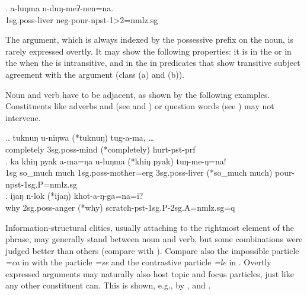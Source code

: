 \exg. a-luŋma n-duŋ-meʔ-nen=na.\\
		{\sc 1sg.poss}-liver {\sc neg-}pour{\sc -npst-1>2=nmlz.sg}\\


The  argument, which is always indexed by the possessive prefix on the noun, is rarely expressed overtly. It may show the following properties: it is in the  or in the  when the  is intransitive, and in the  in predicates that show transitive subject agreement with the  argument (class (a) and (b)). 

Noun and verb have to be adjacent, as shown by the following examples. Constituents like  adverbs and   (see \Next[a] and \Next[b]) or question words (see \Next[c]) may not intervene. 

\ex.\ag. tuknuŋ u-niŋwa (*tuknuŋ) tug-a-ma, {\hspace{-.4cm}\ob\dots\cb}\\
 completely {\sc 3sg.poss}-mind  (*completely) hurt{\sc [3sg]-pst-prf}\\
  
 \bg. ka khiŋ pyak a-ma=ŋa u-luŋma  (*khiŋ pyak) tuŋ-me-ŋ=na!\\
 {\sc 1sg} so\_much much {\sc 1sg.poss-}mother{\sc =erg} {\sc 3sg.poss-}liver (*so\_much much) pour{\sc [ 3sg.A]-npst-1sg.P=nmlz.sg}\\
 \bg. ijaŋ n-lok (*ijaŋ) khot-a-ŋ-ga=na=i?\\
 why	{\sc 2sg.poss}-anger (*why) scratch{\sc -pst-1sg.P-2sg.A=nmlz.sg=q}\\


Information-structural clitics, usually attaching to the rightmost element of the phrase, may generally stand between noun and verb, 
but some combinations were judged better than others (compare \Next[a] with \Next[b]). Compare also the impossible  particle \emph{=ca} in \Next[a] with the  particle \emph{=se} and the contrastive particle \emph{=le} in \NNext. Overtly expressed  arguments  may naturally also host topic and focus particles, just like any other constituent can. This is shown, e.g., by \Next[b], \NNext[c] and \NNext[d].


